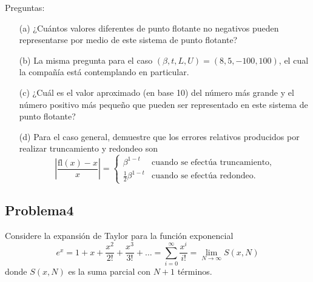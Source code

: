 \documentclass[12pt, a4paper]{article}%
\begin{document}
Preguntas:
\begin{itemize}
    \item[(a)] ¿Cuántos valores diferentes de punto flotante no negativos pueden representarse por medio de este sistema de punto flotante?
    \begin{solution}
        
    \end{solution}
    \item[(b)] La misma pregunta para el caso \( (\beta, t, L, U) = (8, 5, -100, 100) \), el cual la compañía está contemplando en particular.
    \item[(c)] ¿Cuál es el valor aproximado (en base 10) del número más grande y el número positivo más pequeño que pueden ser representado en este sistema de punto flotante?
    \item[(d)] Para el caso general, demuestre que los errores relativos producidos por realizar truncamiento y redondeo son
    \[
    \left|\frac{\text{fl}(x) - x}{x}\right| = 
    \begin{cases}
        \beta^{1-t} & \text{cuando se efectúa truncamiento}, \\
        \frac{1}{2} \beta^{1-t} & \text{cuando se efectúa redondeo}.
    \end{cases}
    \]
\end{itemize}

\subsection*{Problema4}
Considere la expansión de Taylor para la función exponencial
\[
e^x = 1 + x + \frac{x^2}{2!} + \frac{x^3}{3!} + \dots = \sum_{i=0}^{\infty} \frac{x^i}{i!} = \lim_{N \to \infty} S(x, N)
\]
donde \( S(x, N) \) es la suma parcial con \( N + 1 \) términos.
\end{document}

